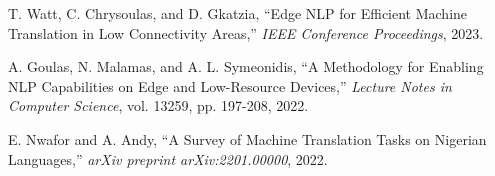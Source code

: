 \documentclass[conference]{IEEEtran}
\begin{document}
\begin{thebibliography}{9}

T. Watt, C. Chrysoulas, and D. Gkatzia, ``Edge NLP for Efficient Machine Translation in Low Connectivity Areas,'' \textit{IEEE Conference Proceedings}, 2023.

A. Goulas, N. Malamas, and A. L. Symeonidis, ``A Methodology for Enabling NLP Capabilities on Edge and Low-Resource Devices,'' \textit{Lecture Notes in Computer Science}, vol. 13259, pp. 197-208, 2022.

E. Nwafor and A. Andy, ``A Survey of Machine Translation Tasks on Nigerian Languages,'' \textit{arXiv preprint arXiv:2201.00000}, 2022.


\end{thebibliography}
\end{document}
